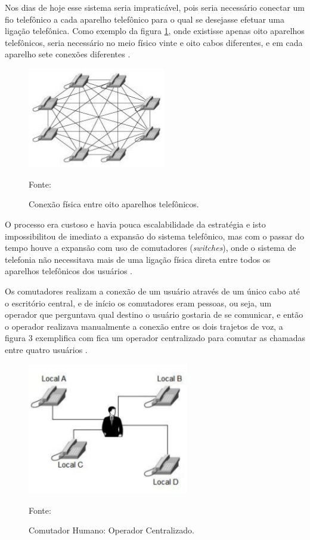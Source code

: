 Nos dias de hoje esse sistema seria impraticável, pois seria necessário conectar um fio telefônico a cada aparelho telefônico para o qual se desejasse efetuar uma ligação telefônica. Como exemplo da figura \ref{Figura2}, onde existisse apenas oito aparelhos telefônicos, seria necessário no meio físico vinte e oito cabos diferentes, e em cada aparelho sete conexões diferentes \cite{eduardomaronasmonks2006}.

\begin{figure}[h]
	\centering
	\includegraphics[width=6.0cm]{imagens/rebeBasicaOitoTel.jpg}
	\caption{Conexão física entre oito aparelhos telefônicos.}
    \label{Figura2}
    Fonte: \cite{davidson2008}
\end{figure}

O processo era custoso e havia pouca escalabilidade da estratégia e isto impossibilitou de imediato a expansão do sistema telefônico, mas com o passar do tempo houve a expansão com uso de comutadores (\textit{switches}), onde o sistema de telefonia não necessitava mais de uma ligação física direta entre todos os aparelhos telefônicos dos usuários \cite{thiagowinkler2007}.

Os comutadores realizam a conexão de um usuário através de um único cabo até o escritório central, e de início os comutadores eram pessoas, ou seja, um operador que perguntava qual destino o usuário gostaria de se comunicar, e então o operador realizava manualmente a conexão entre os dois trajetos de voz, a figura 3 exemplifica com fica um operador centralizado para comutar as chamadas entre quatro usuários \cite{eduardomaronasmonks2006}.

\begin{figure}[h]
	\centering
	\includegraphics[width=7.0cm]{imagens/operadorCentralizado.jpg}
	\caption{Comutador Humano: Operador Centralizado.}
    \label{Figura3}
    Fonte: \cite{davidson2008}
\end{figure}


